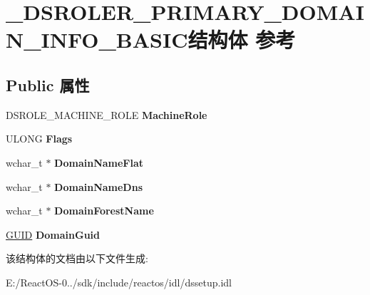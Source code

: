 \hypertarget{struct___d_s_r_o_l_e_r___p_r_i_m_a_r_y___d_o_m_a_i_n___i_n_f_o___b_a_s_i_c}{}\section{\+\_\+\+D\+S\+R\+O\+L\+E\+R\+\_\+\+P\+R\+I\+M\+A\+R\+Y\+\_\+\+D\+O\+M\+A\+I\+N\+\_\+\+I\+N\+F\+O\+\_\+\+B\+A\+S\+I\+C结构体 参考}
\label{struct___d_s_r_o_l_e_r___p_r_i_m_a_r_y___d_o_m_a_i_n___i_n_f_o___b_a_s_i_c}
\subsection*{Public 属性}
\begin{DoxyCompactItemize}
\item 
\mbox{\label{struct___d_s_r_o_l_e_r___p_r_i_m_a_r_y___d_o_m_a_i_n___i_n_f_o___b_a_s_i_c_aaf8d9bdb6dc909f5cce83ccab5ff9e07}} 
D\+S\+R\+O\+L\+E\+\_\+\+M\+A\+C\+H\+I\+N\+E\+\_\+\+R\+O\+LE {\bfseries Machine\+Role}
\item 
\mbox{\label{struct___d_s_r_o_l_e_r___p_r_i_m_a_r_y___d_o_m_a_i_n___i_n_f_o___b_a_s_i_c_aa5226bcbd77689e305f4515c2a505b2e}} 
U\+L\+O\+NG {\bfseries Flags}
\item 
\mbox{\label{struct___d_s_r_o_l_e_r___p_r_i_m_a_r_y___d_o_m_a_i_n___i_n_f_o___b_a_s_i_c_a4e203578c77c4936b9dc02a56ecbe192}} 
wchar\+\_\+t $\ast$ {\bfseries Domain\+Name\+Flat}
\item 
\mbox{\label{struct___d_s_r_o_l_e_r___p_r_i_m_a_r_y___d_o_m_a_i_n___i_n_f_o___b_a_s_i_c_a9b7c96543eeee448149a0cde1bb8d187}} 
wchar\+\_\+t $\ast$ {\bfseries Domain\+Name\+Dns}
\item 
\mbox{\label{struct___d_s_r_o_l_e_r___p_r_i_m_a_r_y___d_o_m_a_i_n___i_n_f_o___b_a_s_i_c_afaea03307ded24560fb5abf72e7ef243}} 
wchar\+\_\+t $\ast$ {\bfseries Domain\+Forest\+Name}
\item 
\mbox{\label{struct___d_s_r_o_l_e_r___p_r_i_m_a_r_y___d_o_m_a_i_n___i_n_f_o___b_a_s_i_c_a38d0fc4f08a06e7b6616af324b9ad484}} 
\hyperlink{interface_g_u_i_d}{G\+U\+ID} {\bfseries Domain\+Guid}
\end{DoxyCompactItemize}


该结构体的文档由以下文件生成\+:\begin{DoxyCompactItemize}
\item 
E\+:/\+React\+O\+S-\/0../sdk/include/reactos/idl/dssetup.\+idl\end{DoxyCompactItemize}
